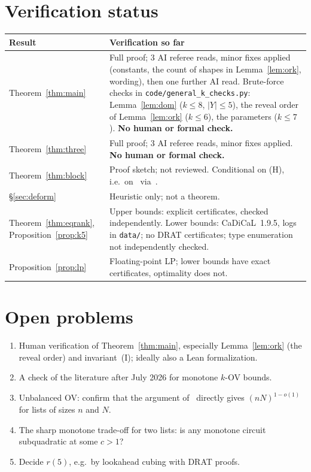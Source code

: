 \documentclass[11pt,a4paper]{article}
\theoremstyle{plain}
\theoremstyle{definition}
\theoremstyle{remark}
\newcommand{\code}[1]{\texttt{\small #1}}
\begin{document}
\section{Verification status}
\begin{center}
\renewcommand{\arraystretch}{1.15}
\begin{tabularx}{\textwidth}{@{}l X@{}}
\toprule
Result & Verification so far\\
\midrule
Theorem~\ref{thm:main} & Full proof; 3 AI referee reads, minor fixes applied (constants, the count of shapes in
Lemma~\ref{lem:ork}, wording), then one further AI read. Brute-force checks in \code{code/general\_k\_checks.py}:
Lemma~\ref{lem:dom} ($k\le8$, $|Y|\le5$), the reveal order of Lemma~\ref{lem:ork} ($k\le6$), the parameters ($k\le7$).
\textbf{No human or formal check.}\\
Theorem~\ref{thm:three} & Full proof; 3 AI referee reads, minor fixes applied. \textbf{No human or formal check.}\\
Theorem~\ref{thm:block} & Proof sketch; not reviewed. Conditional on (H), i.e.\ on~\cite{OpenAI26,Anthropic26}
via~\cite{IPZ01}.\\
\S\ref{sec:deform} & Heuristic only; not a theorem.\\
Theorem~\ref{thm:eqrank}, Proposition~\ref{prop:k5} & Upper bounds: explicit certificates, checked independently.
Lower bounds: CaDiCaL~1.9.5, logs in \code{data/}; no DRAT certificates; type enumeration not independently
checked.\\
Proposition~\ref{prop:lp} & Floating-point LP; lower bounds have exact certificates, optimality does not.\\
\bottomrule
\end{tabularx}
\end{center}

\section{Open problems}
\begin{enumerate}
  \item Human verification of Theorem~\ref{thm:main}, especially Lemma~\ref{lem:ork} (the reveal order) and
    invariant~(I); ideally also a Lean formalization.
  \item A check of the literature after July 2026 for monotone $k$-OV bounds.
  \item Unbalanced OV: confirm that the argument of~\cite{CLSS26} directly gives $(nN)^{1-o(1)}$ for lists of sizes
    $n$ and $N$.
  \item The sharp monotone trade-off for two lists: is any monotone circuit subquadratic at some $c>1$?
  \item Decide $r(5)$, e.g.\ by lookahead cubing with DRAT proofs.
\end{enumerate}
\end{document}
